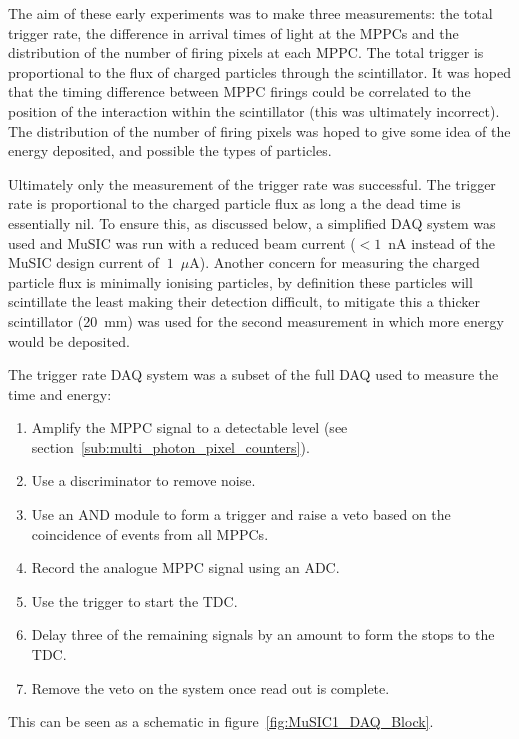 The aim of these early experiments was to make three measurements: the total trigger rate, the difference in arrival times of light at the MPPCs and the distribution of the number of firing pixels at each MPPC. The total trigger is proportional to the flux of charged particles through the scintillator. It was hoped that the timing difference between MPPC firings could be correlated to the position of the interaction within the scintillator (this was ultimately incorrect). The distribution of the number of firing pixels was hoped to give some idea of the energy deposited, and possible the types of particles. 

Ultimately only the measurement of the trigger rate was successful. The trigger rate is proportional to the charged particle flux as long a the dead time is essentially nil. To ensure this, as discussed below, a simplified DAQ system was used and MuSIC was run with a reduced beam current (\(<1\)~nA instead of the MuSIC design current of \(~1\)~\(\mu\)A). Another concern for measuring the charged particle flux is minimally ionising particles, by definition these particles will scintillate the least making their detection difficult, to mitigate this a thicker scintillator (20~mm) was used for the second measurement in which more energy would be deposited.

The trigger rate DAQ system was a subset of the full DAQ used to measure the time and energy:
\begin{enumerate}
  \item Amplify the MPPC signal to a detectable level (see section~\ref{sub:multi_photon_pixel_counters}).
  \item Use a discriminator to remove noise.
  \item Use an AND module to form a trigger and raise a veto based on the coincidence of events from all MPPCs.
  \item Record the analogue MPPC signal using an ADC.
  \item Use the trigger to start the TDC.
  \item Delay three of the remaining signals by an amount to form the stops to the TDC.
  \item Remove the veto on the system once read out is complete.
\end{enumerate}
This can be seen as a schematic in figure~\ref{fig:MuSIC1_DAQ_Block}. 

